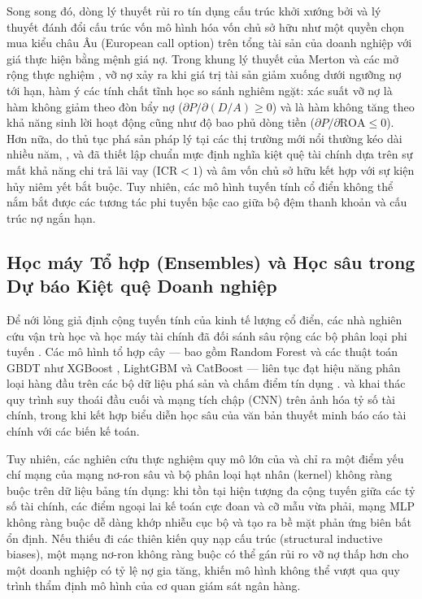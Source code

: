 \documentclass[11pt,a4paper]{article}
\begin{document}
Song song đó, dòng lý thuyết rủi ro tín dụng cấu trúc khởi xướng bởi \citet{merton1974pricing} và lý thuyết đánh đổi cấu trúc vốn \citep{kraus1973state,myers1984capital} mô hình hóa vốn chủ sở hữu như một quyền chọn mua kiểu châu Âu (European call option) trên tổng tài sản của doanh nghiệp với giá thực hiện bằng mệnh giá nợ. Trong khung lý thuyết của Merton và các mở rộng thực nghiệm \citep{hillegeist2004assessing,duffie2007multi,bharath2008forecasting}, vỡ nợ xảy ra khi giá trị tài sản giảm xuống dưới ngưỡng nợ tới hạn, hàm ý các tính chất tĩnh học so sánh nghiêm ngặt: xác suất vỡ nợ là hàm không giảm theo đòn bẩy nợ ($\partial P / \partial (D/A) \ge 0$) và là hàm không tăng theo khả năng sinh lời hoạt động cũng như độ bao phủ dòng tiền ($\partial P / \partial \text{ROA} \le 0$). Hơn nữa, do thủ tục phá sản pháp lý tại các thị trường mới nổi thường kéo dài nhiều năm, \citet{asquith1994anatomy}, \citet{pindado2008estimating} và \citet{tinoco2013financial} đã thiết lập chuẩn mực định nghĩa kiệt quệ tài chính dựa trên sự mất khả năng chi trả lãi vay ($\text{ICR} < 1$) và âm vốn chủ sở hữu kết hợp với sự kiện hủy niêm yết bắt buộc. Tuy nhiên, các mô hình tuyến tính cổ điển không thể nắm bắt được các tương tác phi tuyến bậc cao giữa bộ đệm thanh khoản và cấu trúc nợ ngắn hạn.

\subsection{Học máy Tổ hợp (Ensembles) và Học sâu trong Dự báo Kiệt quệ Doanh nghiệp}
Để nới lỏng giả định cộng tuyến tính của kinh tế lượng cổ điển, các nhà nghiên cứu vận trù học và học máy tài chính đã đối sánh sâu rộng các bộ phân loại phi tuyến \citep{kumar2007bankruptcy,lessmann2015benchmarking,jones2017predicting}. Các mô hình tổ hợp cây --- bao gồm Random Forest \citep{breiman2001random} và các thuật toán GBDT như XGBoost \citep{chen2016xgboost}, LightGBM \citep{ke2017lightgbm} và CatBoost \citep{prokhorenkova2018catboost} --- liên tục đạt hiệu năng phân loại hàng đầu trên các bộ dữ liệu phá sản và chấm điểm tín dụng \citep{geng2015prediction,zieba2016ensemble,barboza2017machine,veganzones2018investigation,gunnarsson2021deep}. \citet{dujardin2015bankruptcy} và \citet{hosaka2019bankruptcy} khai thác quy trình suy thoái đầu cuối và mạng tích chập (CNN) trên ảnh hóa tỷ số tài chính, trong khi \citet{mai2019deep} kết hợp biểu diễn học sâu của văn bản thuyết minh báo cáo tài chính với các biến kế toán.

Tuy nhiên, các nghiên cứu thực nghiệm quy mô lớn của \citet{gunnarsson2021deep} và \citet{dumitrescu2022machine} chỉ ra một điểm yếu chí mạng của mạng nơ-ron sâu và bộ phân loại hạt nhân (kernel) không ràng buộc trên dữ liệu bảng tín dụng: khi tồn tại hiện tượng đa cộng tuyến giữa các tỷ số tài chính, các điểm ngoại lai kế toán cực đoan và cỡ mẫu vừa phải, mạng MLP không ràng buộc dễ dàng khớp nhiễu cục bộ và tạo ra bề mặt phản ứng biên bất ổn định. Nếu thiếu đi các thiên kiến quy nạp cấu trúc (structural inductive biases), một mạng nơ-ron không ràng buộc có thể gán rủi ro vỡ nợ thấp hơn cho một doanh nghiệp có tỷ lệ nợ gia tăng, khiến mô hình không thể vượt qua quy trình thẩm định mô hình của cơ quan giám sát ngân hàng.
\end{document}
